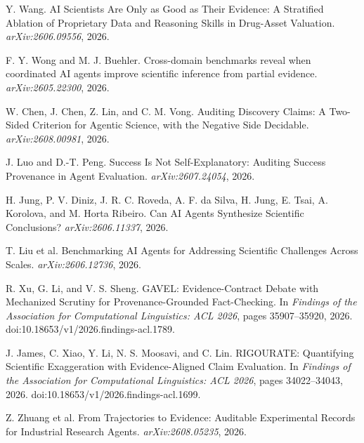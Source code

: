 Y. Wang. AI Scientists Are Only as Good as Their Evidence: A Stratified Ablation of Proprietary Data and Reasoning Skills in Drug-Asset Valuation. \emph{arXiv:2606.09556}, 2026.

F. Y. Wong and M. J. Buehler. Cross-domain benchmarks reveal when coordinated AI agents improve scientific inference from partial evidence. \emph{arXiv:2605.22300}, 2026.

W. Chen, J. Chen, Z. Lin, and C. M. Vong. Auditing Discovery Claims: A Two-Sided Criterion for Agentic Science, with the Negative Side Decidable. \emph{arXiv:2608.00981}, 2026.

J. Luo and D.-T. Peng. Success Is Not Self-Explanatory: Auditing Success Provenance in Agent Evaluation. \emph{arXiv:2607.24054}, 2026.

H. Jung, P. V. Diniz, J. R. C. Roveda, A. F. da Silva, H. Jung, E. Tsai, A. Korolova, and M. Horta Ribeiro. Can AI Agents Synthesize Scientific Conclusions? \emph{arXiv:2606.11337}, 2026.

T. Liu et al. Benchmarking AI Agents for Addressing Scientific Challenges Across Scales. \emph{arXiv:2606.12736}, 2026.

R. Xu, G. Li, and V. S. Sheng. GAVEL: Evidence-Contract Debate with Mechanized Scrutiny for Provenance-Grounded Fact-Checking. In \emph{Findings of the Association for Computational Linguistics: ACL 2026}, pages 35907--35920, 2026. doi:10.18653/v1/2026.findings-acl.1789.

J. James, C. Xiao, Y. Li, N. S. Moosavi, and C. Lin. RIGOURATE: Quantifying Scientific Exaggeration with Evidence-Aligned Claim Evaluation. In \emph{Findings of the Association for Computational Linguistics: ACL 2026}, pages 34022--34043, 2026. doi:10.18653/v1/2026.findings-acl.1699.

Z. Zhuang et al. From Trajectories to Evidence: Auditable Experimental Records for Industrial Research Agents. \emph{arXiv:2608.05235}, 2026.
